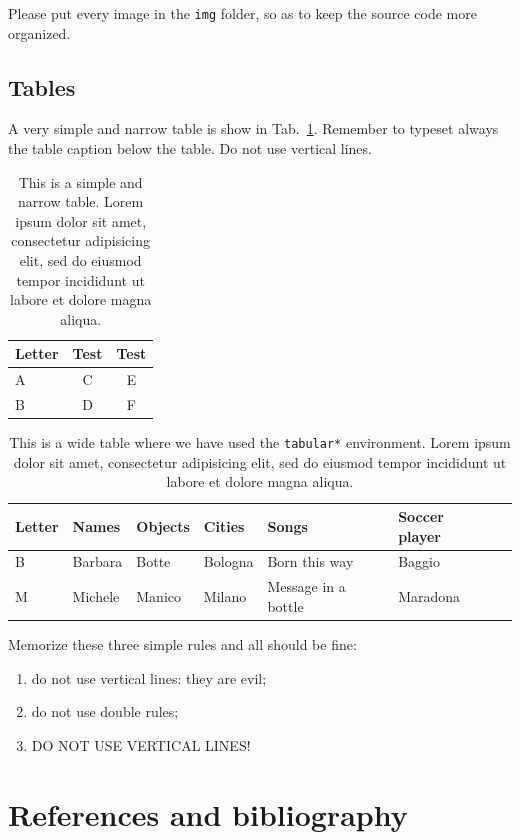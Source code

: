 \documentclass[amsthm,ebook]{saparticle}
\begin{document}
Please put every image in the \texttt{img} folder, so as to keep the source code more organized.

\subsection{Tables}

A very simple and narrow table is show in Tab.~\ref{tab:letters}. Remember to typeset always the table caption below the table. Do not use vertical lines.

\begin{table}
{\small
\begin{tabular}{lcc}
\toprule
Letter & Test & Test \\
\midrule
A & C & E \\
B & D & F \\
\bottomrule
\end{tabular}}
\caption{This is a simple and narrow table. Lorem ipsum dolor sit amet, consectetur adipisicing elit, sed do eiusmod tempor incididunt ut labore et dolore magna aliqua.}
\label{tab:letters}
\end{table}

\begin{table}
{\small
\addtolength{\tabcolsep}{-0.5mm}
\begin{tabular*}{\textwidth}{lllllll}
\toprule
Letter & Names & Objects & Cities & Songs & Soccer player\\
\midrule
B & Barbara & Botte & Bologna & Born this way & Baggio \\
M & Michele & Manico & Milano & Message in a bottle & Maradona \\
\bottomrule
\end{tabular*}}
\caption{This is a wide table where we have used the \texttt{tabular*} environment. Lorem ipsum dolor sit amet, consectetur adipisicing elit, sed do eiusmod tempor incididunt ut labore et dolore magna aliqua.}
\label{tab:widetable}
\end{table}

Memorize these three simple rules and all should be fine:
\begin{enumerate}
\item do not use vertical lines: they are evil;
\item do not use double rules;
\item DO NOT USE VERTICAL LINES!
\end{enumerate}



\section{References and bibliography}
\end{document}
